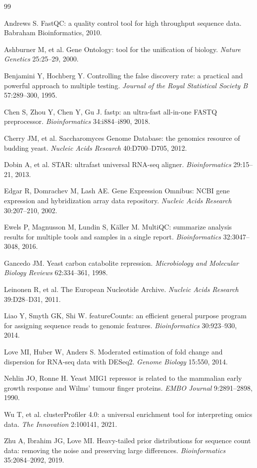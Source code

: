 \documentclass[11pt, a4paper]{article}
\begin{document}
\begin{thebibliography}{99}

 Andrews S. FastQC: a quality control tool for high throughput sequence data. Babraham Bioinformatics, 2010.

 Ashburner M, et al. Gene Ontology: tool for the unification of biology. \textit{Nature Genetics} 25:25--29, 2000.

 Benjamini Y, Hochberg Y. Controlling the false discovery rate: a practical and powerful approach to multiple testing. \textit{Journal of the Royal Statistical Society B} 57:289--300, 1995.

 Chen S, Zhou Y, Chen Y, Gu J. fastp: an ultra-fast all-in-one FASTQ preprocessor. \textit{Bioinformatics} 34:i884--i890, 2018.

 Cherry JM, et al. Saccharomyces Genome Database: the genomics resource of budding yeast. \textit{Nucleic Acids Research} 40:D700--D705, 2012.

 Dobin A, et al. STAR: ultrafast universal RNA-seq aligner. \textit{Bioinformatics} 29:15--21, 2013.

 Edgar R, Domrachev M, Lash AE. Gene Expression Omnibus: NCBI gene expression and hybridization array data repository. \textit{Nucleic Acids Research} 30:207--210, 2002.

 Ewels P, Magnusson M, Lundin S, K{\"a}ller M. MultiQC: summarize analysis results for multiple tools and samples in a single report. \textit{Bioinformatics} 32:3047--3048, 2016.

 Gancedo JM. Yeast carbon catabolite repression. \textit{Microbiology and Molecular Biology Reviews} 62:334--361, 1998.

 Leinonen R, et al. The European Nucleotide Archive. \textit{Nucleic Acids Research} 39:D28--D31, 2011.

 Liao Y, Smyth GK, Shi W. featureCounts: an efficient general purpose program for assigning sequence reads to genomic features. \textit{Bioinformatics} 30:923--930, 2014.

 Love MI, Huber W, Anders S. Moderated estimation of fold change and dispersion for RNA-seq data with DESeq2. \textit{Genome Biology} 15:550, 2014.

 Nehlin JO, Ronne H. Yeast MIG1 repressor is related to the mammalian early growth response and Wilms' tumour finger proteins. \textit{EMBO Journal} 9:2891--2898, 1990.

 Wu T, et al. clusterProfiler 4.0: a universal enrichment tool for interpreting omics data. \textit{The Innovation} 2:100141, 2021.

 Zhu A, Ibrahim JG, Love MI. Heavy-tailed prior distributions for sequence count data: removing the noise and preserving large differences. \textit{Bioinformatics} 35:2084--2092, 2019.

\end{thebibliography}
\end{document}
